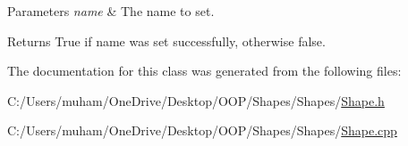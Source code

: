 \begin{DoxyParams}{Parameters}
{\em name} & The name to set. \\
\hline
\end{DoxyParams}
\begin{DoxyReturn}{Returns}
True if name was set successfully, otherwise false. 
\end{DoxyReturn}


The documentation for this class was generated from the following files\+:\begin{DoxyCompactItemize}
\item 
C\+:/\+Users/muham/\+One\+Drive/\+Desktop/\+O\+O\+P/\+Shapes/\+Shapes/\mbox{\hyperlink{_shape_8h}{Shape.\+h}}\item 
C\+:/\+Users/muham/\+One\+Drive/\+Desktop/\+O\+O\+P/\+Shapes/\+Shapes/\mbox{\hyperlink{_shape_8cpp}{Shape.\+cpp}}\end{DoxyCompactItemize}
